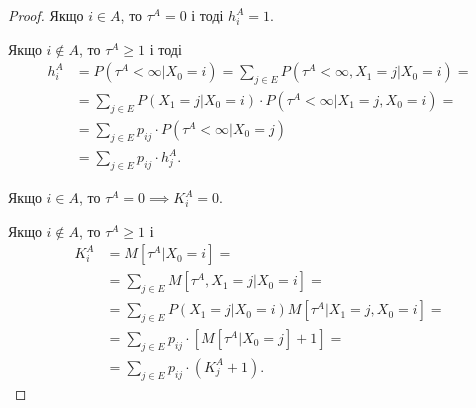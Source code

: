 \begin{proof}
   Якщо $i \in  A$, то $\tau^{A} = 0$ і тоді $h^{A}_i = 1$.

   Якщо $i \not\in A$, то $\tau^{A} \geq 1$ і тоді
   \[  \] 
   \begin{align*}
     h^{A}_{i} &= P\left( \tau^{A}<\infty | X_0 = i \right) = \sum_{j \in E}^{} 
   P\left( \tau^{A}<\infty, X_1 = j | X_0 = i \right) = \\
   &= \sum_{j \in  E}^{} P\left( X_1 = j | X_0 = i \right) \cdot P\left( 
   \tau^{A}<\infty | X_1 = j, X_0 = i \right) = \\
   &= \sum_{j \in E}^{} p_{ij} \cdot P\left( \tau^{A}<\infty | X_0 = j \right) \\
   &= \sum_{j \in E}^{} p_{ij}\cdot h^{A}_{j}
   .\end{align*}

   Якщо $i\in A$, то $\tau^{A} = 0 \implies K^{A}_i = 0$.

   Якщо $i \not\in A$, то $\tau^{A} \geq 1$ і
   \begin{align*}
     K^{A}_i &= M\left[ \tau^{A} | X_0 = i \right] = \\
     &= \sum_{j \in E}^{} M\left[ \tau^{A}, X_1=j | X_0 = i \right] = \\
     &= \sum_{j \in E}^{} P\left( X_1 = j | X_0=i \right) M\left[ \tau^{A} | X_1=j, X_0=i \right] = \\
     &= \sum_{j \in E}^{} p_{ij} \cdot \left[ M\left[ \tau^{A} | X_0 = j \right] + 1 \right]= \\
     &= \sum_{j\in E}^{} p_{ij} \cdot \left( K^{A}_{j} + 1 \right)
   .\end{align*}
 \end{proof}

